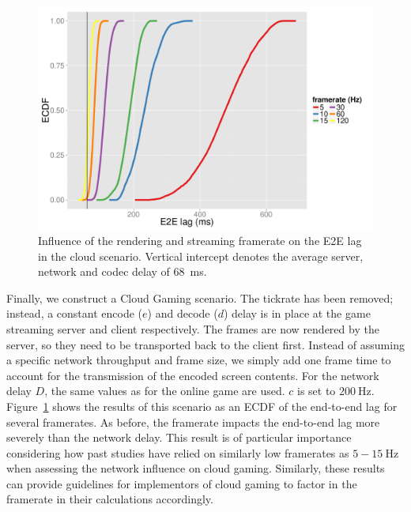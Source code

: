 \begin{figure}[!t]
	\centering
	\includegraphics[width=1.0\columnwidth]{../../../simulation/visualization/cloudgaming-lag-cdf.pdf}
	\caption{Influence of the rendering and streaming framerate on the \gls{E2E} lag in the cloud scenario. Vertical intercept denotes the average server, network and codec delay of \SI{68}{\milli\second}.}
\label{fig:cloud-e2e-delay-sim}
\end{figure}

Finally, we construct a Cloud Gaming scenario. The tickrate has been removed;  instead, a constant encode ($e$) and decode ($d$) delay is in place at the game streaming server and client respectively. The frames are now rendered by the server, so they need to be transported back to the client first. Instead of assuming a specific network throughput and frame size, we simply add one frame time to account for the transmission of the encoded screen contents. For the network delay $D$, the same values as for the online game are used. $c$ is set to $\SI{200}{\hertz}$. Figure~\ref{fig:cloud-e2e-delay-sim} shows the results of this scenario as an \gls{ECDF} of the end-to-end lag for several framerates. As before, the framerate impacts the end-to-end lag more severely than the network delay. This result is of particular importance considering how past studies have relied on similarly low framerates as $5-\SI{15}{\hertz}$ when assessing the network influence on cloud gaming. Similarly, these results can provide guidelines for implementors of cloud gaming to factor in the framerate in their calculations accordingly.

